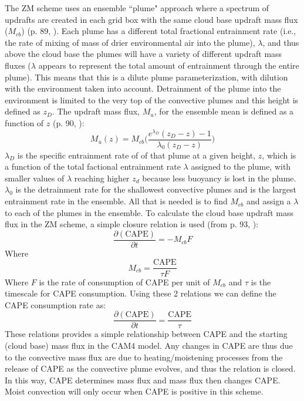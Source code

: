 \documentclass[letterpaper,12pt,titlepage,oneside,final]{book}
\begin{document}
The ZM scheme uses an ensemble ``plume" approach where a spectrum of updrafts are created in each grid box with the same cloud base updraft mass flux ($M_{cb}$) (p. 89, \citep{neale_description_2010}). Each plume has a different total fractional entrainment rate (i.e., the rate of mixing of mass of drier environmental air into the plume), $\lambda$, and thus above the cloud base the plumes will have a variety of different updraft mass fluxes ($\lambda$ appears to represent the total amount of entrainment through the entire plume). This means that this is a dilute plume parameterization, with dilution with the environment taken into account. Detrainment of the plume into the environment is limited to the very top of the convective plumes and this height is defined as $z_{D}$. The updraft mass flux, $M_{u}$, for the ensemble mean is defined as a function of $z$ (p. 90, \citep{neale_description_2010,zhang_sensitivity_1995}):
\begin{equation}\label{eq:updraft}
M_{u}(z)=M_{cb}\Bigg(\frac{e^{\lambda_{D}}(z_{D}-z)-1}{\lambda_{0}(z_{D}-z)}\Bigg)
\end{equation}
$\lambda_{D}$ is the specific entrainment rate of of that plume at a given height, $z$, which is a function of the total factional entrainment rate $\lambda$ assigned to the plume, with smaller values of $\lambda$ reaching higher $z_{d}$ because less buoyancy is lost in the plume. $\lambda_{0}$ is the detrainment rate for the shallowest convective plumes and is the largest entrainment rate in the ensemble. All that is needed is to find $M_{cb}$ and assign a $\lambda$ to each of the plumes in the ensemble. To calculate the cloud base updraft mass flux in the ZM scheme, a simple closure relation is used (from p. 93, \citep{neale_description_2010}):
\begin{equation}\label{eq:closure}
\frac{\partial{(\text{CAPE})}}{\partial{t}}=-M_{cb}F
\end{equation}
Where
\begin{equation}\label{eq:closure1}
M_{cb}=\frac{\text{CAPE}}{\tau{F}}
\end{equation}
Where $F$ is the rate of consumption of CAPE per unit of $M_{cb}$ and $\tau$ is the timescale for CAPE consumption. Using these 2 relations we can define the CAPE consumption rate as:
\begin{equation}\label{eq:closure2}
\frac{\partial{(\text{CAPE})}}{\partial{t}}=\frac{\text{CAPE}}{\tau}
\end{equation}
These relations provides a simple relationship between CAPE and the starting (cloud base) mass flux in the CAM4 model. Any changes in CAPE are thus due to the convective mass flux are due to heating/moistening processes from the release of CAPE as the convective plume evolves, and thus the relation is closed. In this way, CAPE determines mass flux and mass flux then changes CAPE. Moist convection will only occur when CAPE is positive in this scheme.
\end{document}
